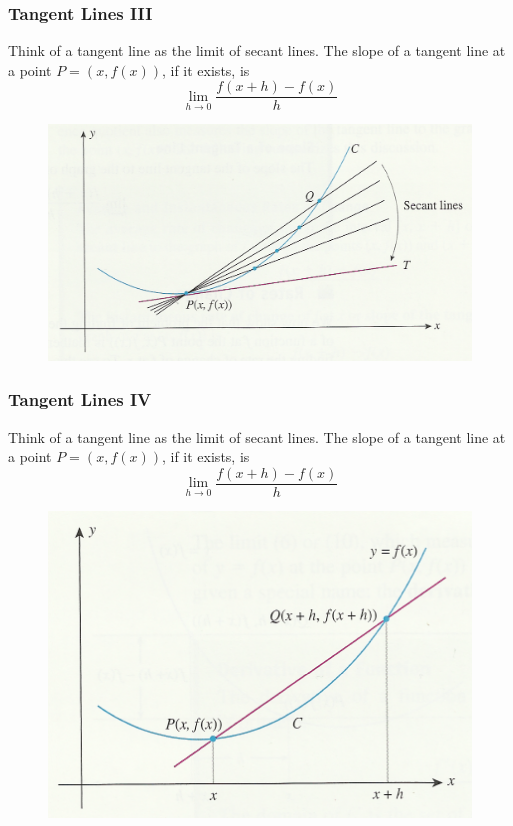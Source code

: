 \documentclass[xcolor=dvipsnames]{beamer}
\begin{document}
\begin{frame}
  \frametitle{Tangent Lines III}
  Think of a tangent line as the limit of secant lines. The slope of a
  tangent line at a point $P=(x,f(x))$, if it exists, is
\begin{equation}
  \label{eq:cheevooj}
  \lim_{h\rightarrow{}0}\frac{f(x+h)-f(x)}{h}
\end{equation}
  \begin{figure}[h]
    \includegraphics[scale=.7]{./diagrams/tangent1.png}
  \end{figure}
\end{frame}

\begin{frame}
  \frametitle{Tangent Lines IV}
  Think of a tangent line as the limit of secant lines. The slope of a
  tangent line at a point $P=(x,f(x))$, if it exists, is
\begin{equation}
  \label{eq:faiseeth}
  \lim_{h\rightarrow{}0}\frac{f(x+h)-f(x)}{h}
\end{equation}
  \begin{figure}[h]
    \includegraphics[scale=.7]{./diagrams/tangent2.png}
  \end{figure}
\end{frame}
\end{document}
